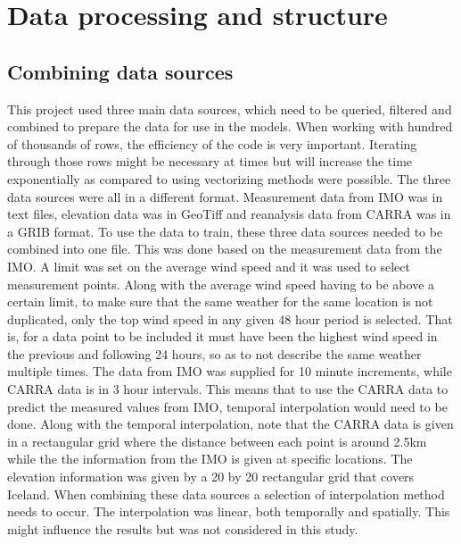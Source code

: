 \chapter{Data processing and structure} %

\label{Chapter3} %


\section{Combining data sources}

This project used three main data sources, which need to be queried, filtered and combined to prepare the data for use in the models. When working with hundred of thousands of rows, the efficiency of the code is very important. Iterating through those rows might be necessary at times but will increase the time exponentially as compared to using vectorizing methods were possible. The three data sources were all in a different format. Measurement data from IMO was in text files, elevation data was in GeoTiff and reanalysis data from CARRA was in a GRIB format. To use the data to train, these three data sources needed to be combined into one file. This was done based on the measurement data from the IMO. A limit was set on the average wind speed and it was used to select measurement points. Along with the average wind speed having to be above a certain limit, to make sure that the same weather for the same location is not duplicated, only the top wind speed in any given 48 hour period is selected. That is, for a data point to be included it must have been the highest wind speed in the previous and following 24 hours, so as to not describe the same weather multiple times. The data from IMO was supplied for 10 minute increments, while CARRA data is in 3 hour intervals. This means that to use the CARRA data to predict the measured values from IMO, temporal interpolation would need to be done. Along with the temporal interpolation, note that the CARRA data is given in a rectangular grid where the distance between each point is around 2.5km while the the information from the IMO is given at specific locations. The elevation information was given by a 20 by 20 rectangular grid that covers Iceland. When combining these data sources a selection of interpolation method needs to occur. The interpolation was linear, both temporally and spatially. This might influence the results but was not considered in this study.

